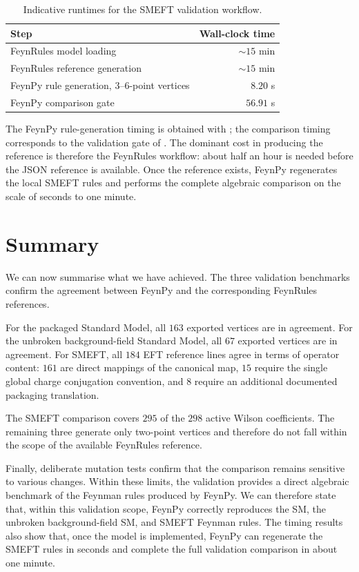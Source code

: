 \begin{table}[htbp]
\centering
\begin{tabular}{lr}
\toprule
Step & Wall-clock time \\
\midrule
FeynRules model loading & $\sim 15$ min \\
FeynRules reference generation & $\sim 15$ min \\
FeynPy rule generation, $3$--$6$-point vertices & $8.20$ s \\
FeynPy comparison gate & $56.91$ s \\
\bottomrule
\end{tabular}
\caption{Indicative runtimes for the SMEFT validation workflow.}
\label{tab:validation-performance}
\end{table}

The FeynPy rule-generation timing is obtained with ; the comparison timing corresponds to the validation gate of . The dominant cost in producing the reference is therefore the FeynRules workflow: about half an hour is needed before the JSON reference is available. Once the reference exists, FeynPy regenerates the local SMEFT rules and performs the complete algebraic comparison on the scale of seconds to one minute.


\section{Summary}
\label{sec:validation-summary}

We can now summarise what we have achieved. The three validation benchmarks confirm the agreement between FeynPy and the corresponding FeynRules references.

For the packaged Standard Model, all $163$ exported vertices are in agreement. For the unbroken background-field Standard Model, all $67$ exported vertices are in agreement. For SMEFT, all $184$ EFT reference lines agree in terms of operator content: $161$ are direct mappings of the canonical map, $15$ require the single global charge conjugation convention, and $8$ require an additional documented packaging translation.

The SMEFT comparison covers $295$ of the $298$ active Wilson coefficients. The remaining three generate only two-point vertices and therefore do not fall within the scope of the available FeynRules reference.

Finally, deliberate mutation tests confirm that the comparison remains sensitive to various changes. Within these limits, the validation provides a direct algebraic benchmark of the Feynman rules produced by FeynPy. We can therefore state that, within this validation scope, FeynPy correctly reproduces the SM, the unbroken background-field SM, and SMEFT Feynman rules. The timing results also show that, once the model is implemented, FeynPy can regenerate the SMEFT rules in seconds and complete the full validation comparison in about one minute.

